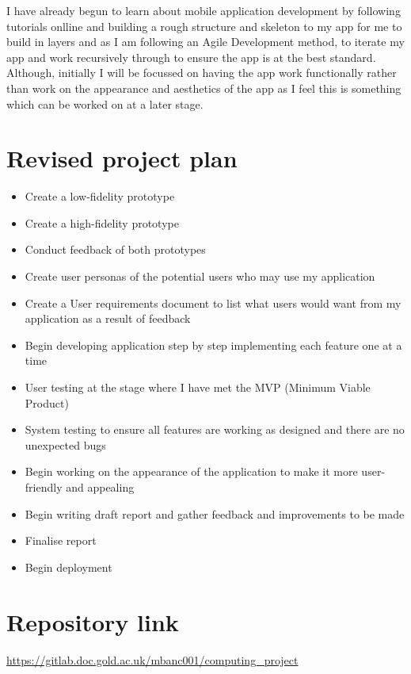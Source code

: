 \documentclass{report}
\begin{document}
I have already begun to learn about mobile application development by following tutorials onlline and building a rough structure and skeleton to my app for me to build in layers and as I am following an Agile Development method, to iterate my app and work recursively through to ensure the app is at the best standard. Although, initially I will be focussed on having the app work functionally rather than work on the appearance and aesthetics of the app as I feel this is something which can be worked on at a later stage.

\section*{Revised project plan}
\begin{itemize}
	\item Create a low-fidelity prototype
	\item Create a high-fidelity prototype
	\item Conduct feedback of both prototypes
	\item Create user personas of the potential users who may use my application
	\item Create a User requirements document to list what users would want from my application as a result of feedback
	\item Begin developing application step by step implementing each feature one at a time
	\item User testing at the stage where I have met the MVP (Minimum Viable Product)
	\item System testing to ensure all features are working as designed and there are no unexpected bugs
	\item Begin working on the appearance of the application to make it more user-friendly and appealing
	\item Begin writing draft report and gather feedback and improvements to be made
	\item Finalise report
	\item Begin deployment
\end{itemize}


\section*{Repository link}
\url{https://gitlab.doc.gold.ac.uk/mbanc001/computing_project}
\end{document}
